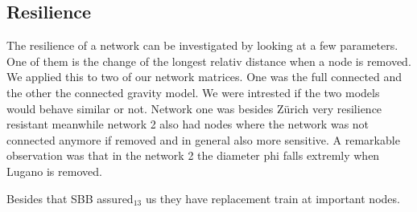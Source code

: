 \documentclass[11pt]{article}
\begin{document}
\subsection{Resilience}

The resilience of a network can be investigated by looking at a few parameters. One of them is the change of the longest relativ distance when a node is removed. We applied this to two of our network matrices. One was the full connected and the other the connected gravity model. We were intrested if the two models would behave similar or not. Network one was besides Z\"urich very resilience resistant meanwhile network 2 also had nodes where the network was not connected anymore if removed and in general also more sensitive. A remarkable observation was that in the network 2 the diameter phi falls extremly when Lugano is removed.


 
Besides that SBB assured$_{13}$ us they have replacement train at important nodes.
\end{document}

